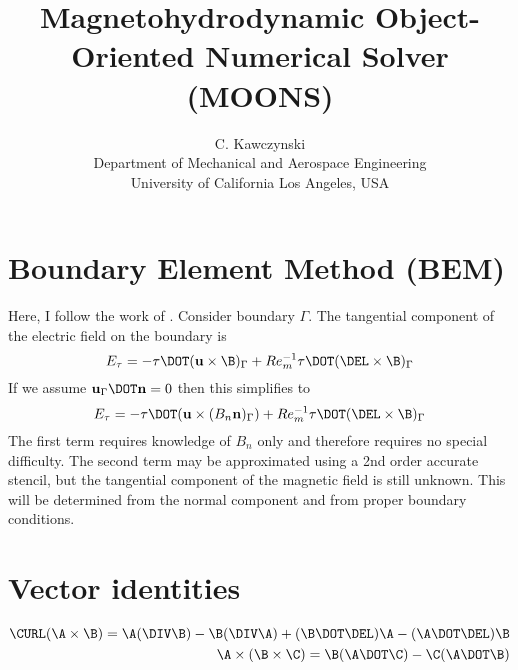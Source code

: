 \documentclass[11pt]{article}
\begin{document}
\doublespacing
\title{Magnetohydrodynamic Object-Oriented Numerical Solver (MOONS)}
\author{C. Kawczynski \\
Department of Mechanical and Aerospace Engineering \\
University of California Los Angeles, USA\\
}

\section{Boundary Element Method (BEM)}
Here, I follow the work of \cite{Iskakov2004}. Consider boundary $\Gamma$. The tangential component of the electric field on the boundary is
\begin{equation}
  E_{\tau} = -\mathbf{\tau} \DOT (\mathbf{u} \times \B)_{\Gamma} + 
  Re_m^{-1} \mathbf{\tau} \DOT (\DEL \times \B)_{\Gamma}
\end{equation}
If we assume $\mathbf{u}_{\Gamma} \DOT \mathbf{n} = 0$ then this simplifies to
\begin{equation}
  E_{\tau} = -\mathbf{\tau} \DOT (\mathbf{u} \times (B_n \mathbf{n})_{\Gamma}) + 
  Re_m^{-1} \mathbf{\tau} \DOT (\DEL \times \B)_{\Gamma}
\end{equation}
The first term requires knowledge of $B_n$ only and therefore requires no special difficulty. The second term may be approximated using a 2nd order accurate stencil, but the tangential component of the magnetic field is still unknown. This will be determined from the normal component and from proper boundary conditions.

\section{Vector identities}
\begin{equation}\begin{aligned}
  \CURL (\A \times \B) = \A (\DIV \B) - \B (\DIV \A) + (\B \DOT \DEL)\A - (\A \DOT \DEL)\B \\
  \A \times (\B \times \C) = \B (\A \DOT \C) - \C (\A \DOT \B)
\end{aligned}\end{equation}
\end{document}
